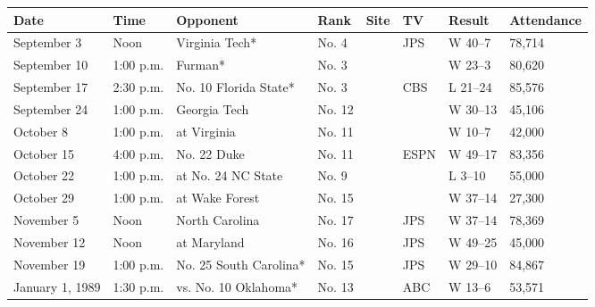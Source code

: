 \documentclass{article}
\begin{document}
\begin{tabular}{llllllll}
\toprule
Date & Time & Opponent & Rank & Site & TV & Result & Attendance \\
\midrule
September 3 & Noon & Virginia Tech* & No. 4 &  & JPS & W 40–7 & 78,714 \\
September 10 & 1:00 p.m. & Furman* & No. 3 &  &  & W 23–3 & 80,620 \\
September 17 & 2:30 p.m. & No. 10 Florida State* & No. 3 &  & CBS & L 21–24 & 85,576 \\
September 24 & 1:00 p.m. & Georgia Tech & No. 12 &  &  & W 30–13 & 45,106 \\
October 8 & 1:00 p.m. & at Virginia & No. 11 &  &  & W 10–7 & 42,000 \\
October 15 & 4:00 p.m. & No. 22 Duke & No. 11 &  & ESPN & W 49–17 & 83,356 \\
October 22 & 1:00 p.m. & at No. 24 NC State & No. 9 &  &  & L 3–10 & 55,000 \\
October 29 & 1:00 p.m. & at Wake Forest & No. 15 &  &  & W 37–14 & 27,300 \\
November 5 & Noon & North Carolina & No. 17 &  & JPS & W 37–14 & 78,369 \\
November 12 & Noon & at Maryland & No. 16 &  & JPS & W 49–25 & 45,000 \\
November 19 & 1:00 p.m. & No. 25 South Carolina* & No. 15 &  & JPS & W 29–10 & 84,867 \\
January 1, 1989 & 1:30 p.m. & vs. No. 10 Oklahoma* & No. 13 &  & ABC & W 13–6 & 53,571 \\
\bottomrule
\end{tabular}
\end{document}
